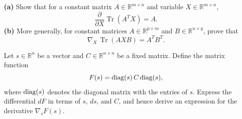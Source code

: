 \begin{exercise}
   \textbf{(a)} Show that for a constant matrix $A\in\mathbb{R}^{m\times n}$ and variable $X\in\mathbb{R}^{m\times n}$,
   \[
      \frac{\partial}{\partial X} \operatorname{Tr}(A^T X) = A.
   \]
   \textbf{(b)} More generally, for constant matrices $A\in\mathbb{R}^{p\times m}$ and $B\in\mathbb{R}^{n\times q}$, prove that
   \[
      \nabla_X\,\operatorname{Tr}(A X B) = A^T B^T.
   \]
\end{exercise}

\begin{exercise}
   Let $s\in\mathbb{R}^n$ be a vector and $C\in\mathbb{R}^{n\times n}$ be a fixed matrix. Define the matrix function 
   \[
      F(s) = \mathrm{diag}(s)\,C\,\mathrm{diag}(s),
   \]
   where $\mathrm{diag}(s)$ denotes the diagonal matrix with the entries of $s$. Express the differential $dF$ in terms of $s$, $ds$, and $C$, and hence derive an expression for the derivative $\nabla_s F(s)$.
\end{exercise}

